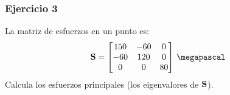 \documentclass[12pt]{beamer}
\begin{document}
\begin{frame}
\frametitle{Ejercicio 3}
La matriz de esfuerzos en un punto es:
\renewcommand{\arraystretch}{1}
\begin{align*}
\vb{S} = 
\begin{bmatrix}
150 & -60 & 0 \\
-60 & 120 & 0 \\
0 & 0 & 80
\end{bmatrix} \, \si{\megapascal}
\end{align*}
Calcula los esfuerzos principales (los eigenvalores de $\vb{S}$).
\end{frame}
\end{document}
